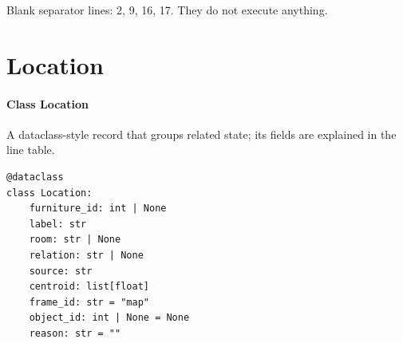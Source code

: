 \documentclass[11pt,a4paper]{book}
\begin{document}
Blank separator lines: 2, 9, 16, 17. They do not execute anything.

\section{Location}

\paragraph{Class Location}
A dataclass-style record that groups related state; its fields are explained in the line table.


\begin{lstlisting}[firstnumber=18]
@dataclass
class Location:
    furniture_id: int | None
    label: str
    room: str | None
    relation: str | None
    source: str
    centroid: list[float]
    frame_id: str = "map"
    object_id: int | None = None
    reason: str = ""


\end{lstlisting}
\end{document}
